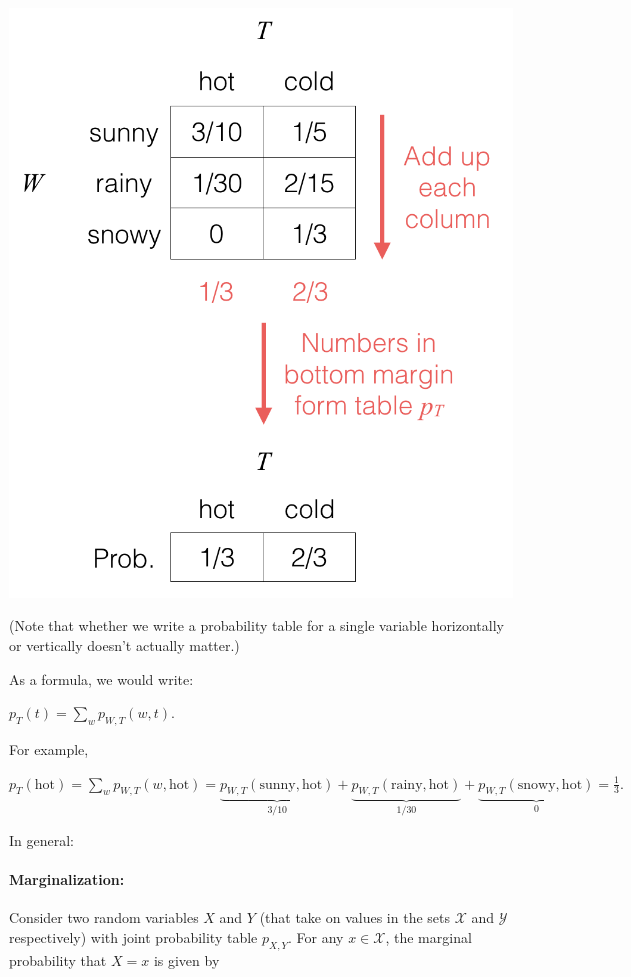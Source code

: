 \documentclass[6008notes.tex]{subfiles}
\begin{document}
{\centering\includegraphics[scale=0.4]{images_sec-joint-rv-marg-cols} \par}

(Note that whether we write a probability table for a single variable horizontally or vertically doesn't actually matter.)

As a formula, we would write:

{\centering$p_{T}(t)=\sum _{w}p_{W,T}(w,t).$ \par}
 
For example,

{\centering$p_{T}(\text {hot})=\sum _{w}p_{W,T}(w,\text {hot})=\underbrace{p_{W,T}(\text {sunny},\text {hot})}_{3/10}+\underbrace{p_{W,T}(\text {rainy},\text {hot})}_{1/30}+\underbrace{p_{W,T}(\text {snowy},\text {hot})}_{0}=\frac{1}{3}.$ \par}
 
In general:

\paragraph{Marginalization:} Consider two random variables $X$ and $Y$ (that take on values in the sets $\mathcal{X}$ and $\mathcal{Y}$ respectively) with joint probability table $p_{X,Y}$. For any $x\in \mathcal{X}$, the marginal probability that $X=x$ is given by
\end{document}
